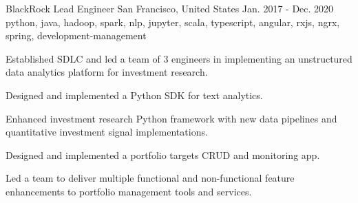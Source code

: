 \cventry
    {BlackRock} %
    {Lead Engineer} %
    {San Francisco, United States} %
    {Jan. 2017 - Dec. 2020} %
    { python, java, hadoop, spark, nlp, jupyter, scala, typescript, angular, rxjs, ngrx, spring, development-management} %
    {
    \begin{cvitems} %
        \item {Established SDLC and led a team of 3 engineers in implementing an unstructured data analytics platform for investment research. }
        \item {Designed and implemented a Python SDK for text analytics. }
        \item {Enhanced investment research Python framework with new data pipelines and quantitative investment signal implementations. }
        \item {Designed and implemented a portfolio targets CRUD and monitoring app. }
        \item {Led a team to deliver multiple functional and non-functional feature enhancements to portfolio management tools and services. }
    \end{cvitems}
    }
